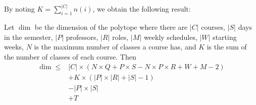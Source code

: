 By noting $K = \sum_{i=1}^{|C|} n(i)$, we obtain the following result:

\begin{thm}
  \label{thm:dimbound}
Let $\dim$ be the dimension of the polytope where there are $|C|$ courses, $|S|$ days in the semester, $|P|$ professors, $|R|$ roles, $|M|$ weekly schedules, $|W|$ starting weeks, $N$ is the maximum number of classes a course has, and $K$ is the sum of the number of classes of each course. Then
\begin{align*}
  \dim \le &|C| \times (N \times Q
                     + P \times S
                     - N \times P \times R
                     + W
                     + M
                     - 2)\\
           &+ K \times (|P| \times |R| + |S| - 1)\\
           &- |P| \times |S|\\
           &+ T
\end{align*}
\end{thm}
